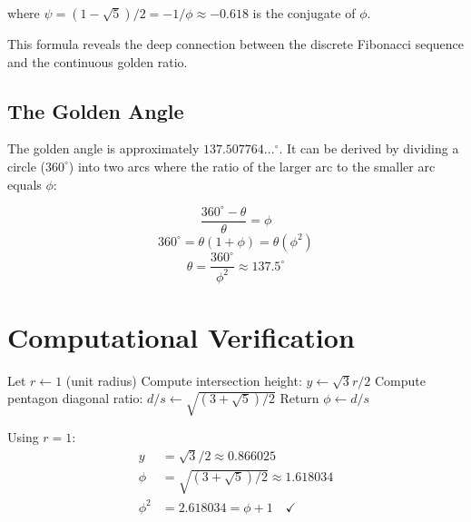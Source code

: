 where $\psi = (1-\sqrt{5})/2 = -1/\phi \approx -0.618$ is the conjugate of $\phi$.

This formula reveals the deep connection between the discrete Fibonacci sequence and the continuous golden ratio.

\subsection{The Golden Angle}

The golden angle is approximately $137.507764...^\circ$. It can be derived by dividing a circle ($360^\circ$) into two arcs where the ratio of the larger arc to the smaller arc equals $\phi$:

\[
\frac{360^\circ - \theta}{\theta} = \phi
\]
\[
360^\circ = \theta(1 + \phi) = \theta(\phi^2)
\]
\[
\theta = \frac{360^\circ}{\phi^2} \approx 137.5^\circ
\]

\section{Computational Verification}

\begin{algorithm}[H]
\caption{Golden Ratio from Vesica Piscis}
\begin{algorithmic}[1]
\State Let $r \gets 1$ (unit radius)
\State Compute intersection height: $y \gets \sqrt{3}r/2$
\State Compute pentagon diagonal ratio: $d/s \gets \sqrt{(3 + \sqrt{5})/2}$
\State Return $\phi \gets d/s$
\end{algorithmic}
\end{algorithm}

\begin{example}
Using $r = 1$:
\begin{align*}
y &= \sqrt{3}/2 \approx 0.866025 \\
\phi &= \sqrt{(3 + \sqrt{5})/2} \approx 1.618034 \\
\phi^2 &= 2.618034 = \phi + 1 \quad \checkmark
\end{align*}
\end{example}

